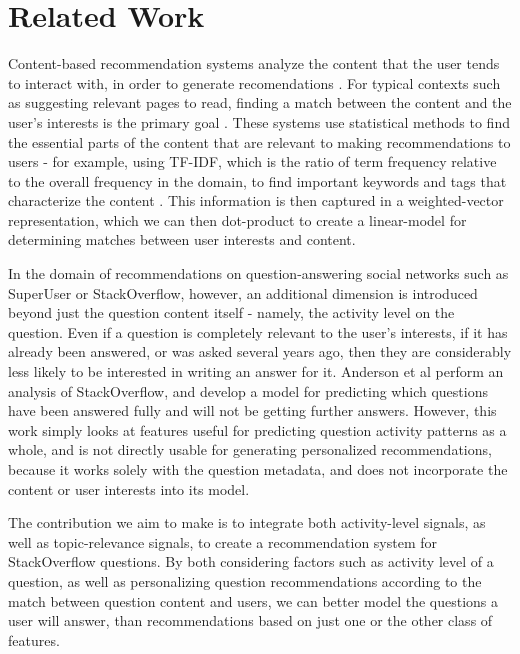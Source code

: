 \documentclass[a4paper]{article}
\begin{document}
\section{Related Work}

Content-based recommendation systems analyze the content that the user tends to interact with, in order to generate recomendations \cite{pazzani2007}. For typical contexts such as suggesting relevant pages to read, finding a match between the content and the user's interests is the primary goal \cite{ansari2000}. These systems use statistical methods to find the essential parts of the content that are relevant to making recommendations to users - for example, using TF-IDF, which is the ratio of term frequency relative to the overall frequency in the domain, to find important keywords and tags that characterize the content \cite{pazzani2007}. This information is then captured in a weighted-vector representation, which we can then dot-product to create a linear-model \cite{lewis1996} for determining matches between user interests and content.

In the domain of recommendations on question-answering social networks such as SuperUser or StackOverflow, however, an additional dimension is introduced beyond just the question content itself - namely, the activity level on the question. Even if a question is completely relevant to the user's interests, if it has already been answered, or was asked several years ago, then they are considerably less likely to be interested in writing an answer for it. Anderson et al \cite{anderson2012} perform an analysis of StackOverflow, and develop a model for predicting which questions have been answered fully and will not be getting further answers. However, this work simply looks at features useful for predicting question activity patterns as a whole, and is not directly usable for generating personalized recommendations, because it works solely with the question metadata, and does not incorporate the content or user interests into its model.

The contribution we aim to make is to integrate both activity-level signals, as well as topic-relevance signals, to create a recommendation system for StackOverflow questions. By both considering factors such as activity level of a question, as well as personalizing question recommendations according to the match between question content and users, we can better model the questions a user will answer, than recommendations based on just one or the other class of features.
\end{document}
